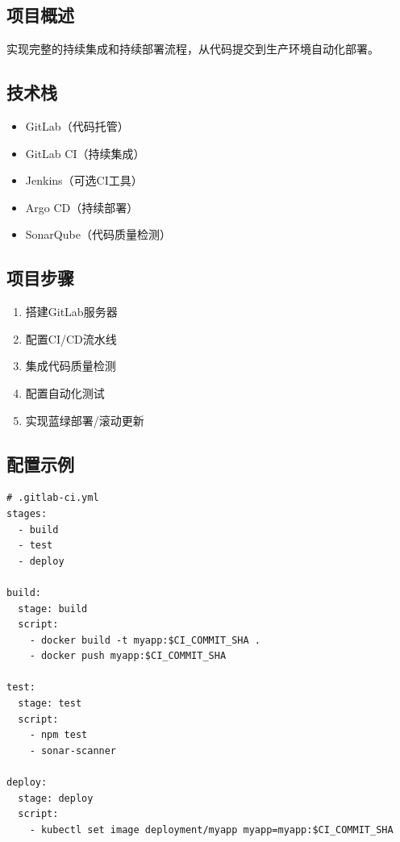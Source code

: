 \documentclass[12pt,UTF8]{ctexbook}
\begin{document}
\subsection*{项目概述}

实现完整的持续集成和持续部署流程，从代码提交到生产环境自动化部署。

\subsection*{技术栈}

\begin{itemize}
    \item GitLab（代码托管）
    \item GitLab CI（持续集成）
    \item Jenkins（可选CI工具）
    \item Argo CD（持续部署）
    \item SonarQube（代码质量检测）
\end{itemize}

\subsection*{项目步骤}

\begin{enumerate}
    \item 搭建GitLab服务器
    \item 配置CI/CD流水线
    \item 集成代码质量检测
    \item 配置自动化测试
    \item 实现蓝绿部署/滚动更新
\end{enumerate}

\subsection*{配置示例}

\begin{lstlisting}
# .gitlab-ci.yml
stages:
  - build
  - test
  - deploy

build:
  stage: build
  script:
    - docker build -t myapp:$CI_COMMIT_SHA .
    - docker push myapp:$CI_COMMIT_SHA

test:
  stage: test
  script:
    - npm test
    - sonar-scanner

deploy:
  stage: deploy
  script:
    - kubectl set image deployment/myapp myapp=myapp:$CI_COMMIT_SHA
\end{lstlisting}
\end{document}
